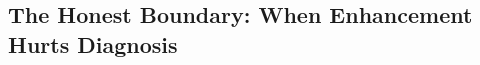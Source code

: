 %
%
%
%

\subsection{The Honest Boundary: When Enhancement Hurts Diagnosis}\label{sec:exp-boundary}


